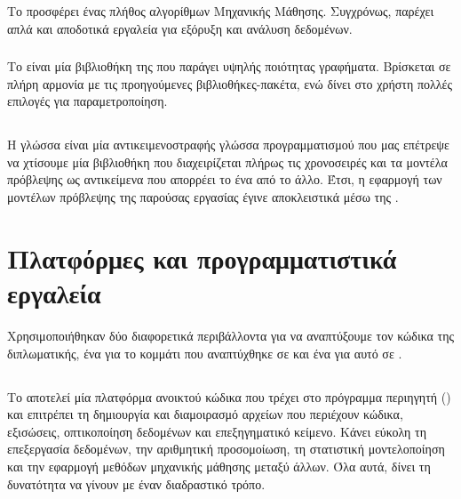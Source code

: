 Το  προσφέρει ένας πλήθος αλγορίθμων Μηχανικής Μάθησης. Συγχρόνως, παρέχει απλά και αποδοτικά εργαλεία για εξόρυξη και ανάλυση δεδομένων.

\subsubsection{}

Το  είναι μία βιβλιοθήκη της  που παράγει υψηλής ποιότητας γραφήματα. Βρίσκεται σε πλήρη αρμονία με τις προηγούμενες βιβλιοθήκες-πακέτα, ενώ δίνει στο χρήστη πολλές επιλογές για παραμετροποίηση.

\subsection{}

Η γλώσσα  είναι μία αντικειμενοστραφής γλώσσα προγραμματισμού που μας επέτρεψε να χτίσουμε μία βιβλιοθήκη που διαχειρίζεται πλήρως τις χρονοσειρές και τα μοντέλα πρόβλεψης ως αντικείμενα που απορρέει το ένα από το άλλο. Έτσι, η εφαρμογή των μοντέλων πρόβλεψης της παρούσας εργασίας έγινε αποκλειστικά μέσω της .

\section{Πλατφόρμες και προγραμματιστικά εργαλεία}

Χρησιμοποιήθηκαν δύο διαφορετικά περιβάλλοντα για να αναπτύξουμε τον κώδικα της διπλωματικής, ένα για το κομμάτι που αναπτύχθηκε σε  και ένα για αυτό σε .

\subsection{}

Το  αποτελεί μία πλατφόρμα ανοικτού κώδικα που τρέχει στο πρόγραμμα περιηγητή () και επιτρέπει τη δημιουργία και διαμοιρασμό αρχείων που περιέχουν κώδικα, εξισώσεις, οπτικοποίηση δεδομένων και επεξηγηματικό κείμενο. Κάνει εύκολη τη επεξεργασία δεδομένων, την αριθμητική προσομοίωση, τη στατιστική μοντελοποίηση και την εφαρμογή μεθόδων μηχανικής μάθησης μεταξύ άλλων. Όλα αυτά, δίνει τη δυνατότητα να γίνουν με έναν διαδραστικό τρόπο.

\subsection{}

